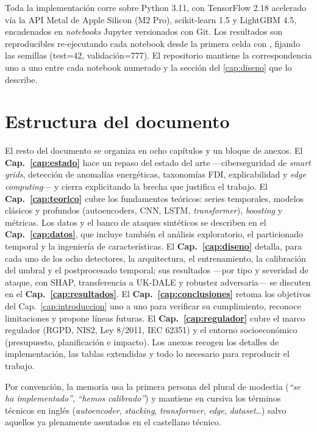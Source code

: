 Toda la implementación corre sobre Python 3.11, con TensorFlow 2.18 acelerado vía la API Metal de Apple Silicon (M2 Pro), scikit-learn 1.5 y LightGBM 4.5, encadenados en \textit{notebooks} Jupyter versionados con Git. Los resultados son reproducibles re-ejecutando cada notebook desde la primera celda con , fijando las semillas (test=42, validación=777). El repositorio mantiene la correspondencia uno a uno entre cada notebook numerado y la sección del \cref{cap:diseno} que lo describe.

\section{Estructura del documento}
\label{sec:estructura}

El resto del documento se organiza en ocho capítulos y un bloque de anexos. El \textbf{Cap.~\ref{cap:estado}} hace un repaso del estado del arte ---ciberseguridad de \textit{smart grids}, detección de anomalías energéticas, taxonomías FDI, explicabilidad y \textit{edge computing}--- y cierra explicitando la brecha que justifica el trabajo. El \textbf{Cap.~\ref{cap:teorico}} cubre los fundamentos teóricos: series temporales, modelos clásicos y profundos (autoencoders, CNN, LSTM, \textit{transformer}), \textit{boosting} y métricas. Los datos y el banco de ataques sintéticos se describen en el \textbf{Cap.~\ref{cap:datos}}, que incluye también el análisis exploratorio, el particionado temporal y la ingeniería de características. El \textbf{Cap.~\ref{cap:diseno}} detalla, para cada uno de los ocho detectores, la arquitectura, el entrenamiento, la calibración del umbral y el postprocesado temporal; sus resultados ---por tipo y severidad de ataque, con SHAP, transferencia a UK-DALE y robustez adversaria--- se discuten en el \textbf{Cap.~\ref{cap:resultados}}. El \textbf{Cap.~\ref{cap:conclusiones}} retoma los objetivos del Cap.~\ref{cap:introduccion} uno a uno para verificar su cumplimiento, reconoce limitaciones y propone líneas futuras. El \textbf{Cap.~\ref{cap:regulador}} cubre el marco regulador (RGPD, NIS2, Ley 8/2011, IEC 62351) y el entorno socioeconómico (presupuesto, planificación e impacto). Los anexos recogen los detalles de implementación, las tablas extendidas y todo lo necesario para reproducir el trabajo.

\noindent Por convención, la memoria usa la primera persona del plural de modestia (\textit{``se ha implementado''}, \textit{``hemos calibrado''}) y mantiene en cursiva los términos técnicos en inglés (\textit{autoencoder}, \textit{stacking}, \textit{transformer}, \textit{edge}, \textit{dataset}\ldots) salvo aquellos ya plenamente asentados en el castellano técnico.
